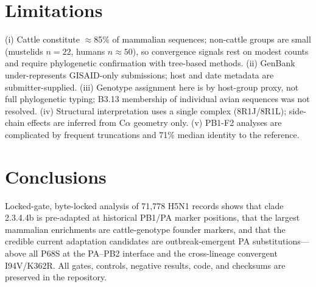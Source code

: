 \documentclass[11pt]{article}
\begin{document}
\section{Limitations}
(i) Cattle constitute $\approx$85\% of mammalian sequences; non-cattle groups are small (mustelids $n=22$, humans $n\approx50$), so convergence signals rest on modest counts and require phylogenetic confirmation with tree-based methods. (ii) GenBank under-represents GISAID-only submissions; host and date metadata are submitter-supplied. (iii) Genotype assignment here is by host-group proxy, not full phylogenetic typing; B3.13 membership of individual avian sequences was not resolved. (iv) Structural interpretation uses a single complex (8R1J/8R1L); side-chain effects are inferred from C$\alpha$ geometry only. (v) PB1-F2 analyses are complicated by frequent truncations and 71\% median identity to the reference.

\section{Conclusions}
Locked-gate, byte-locked analysis of 71,778 H5N1 records shows that clade 2.3.4.4b is pre-adapted at historical PB1/PA marker positions, that the largest mammalian enrichments are cattle-genotype founder markers, and that the credible current adaptation candidates are outbreak-emergent PA substitutions---above all P68S at the PA--PB2 interface and the cross-lineage convergent I94V/K362R. All gates, controls, negative results, code, and checksums are preserved in the repository.
\end{document}
